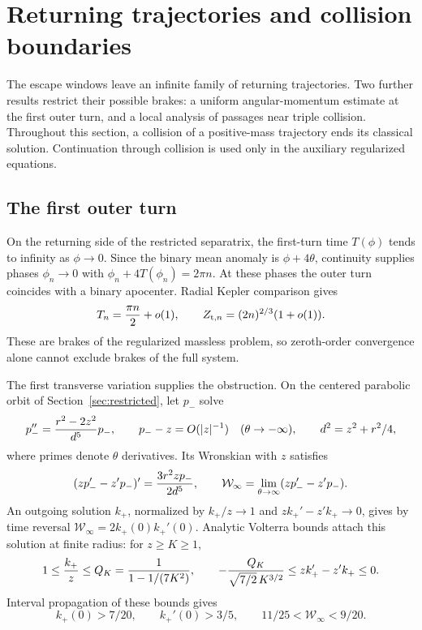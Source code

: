 \section{Returning trajectories and collision boundaries}\label{sec:returns}

The escape windows leave an infinite family of returning trajectories.
Two further results restrict their possible brakes: a uniform angular-momentum
estimate at the first outer turn, and a local analysis of passages near
triple collision. Throughout this section, a collision of a positive-mass
trajectory ends its classical solution. Continuation through collision is
used only in the auxiliary regularized equations.

\subsection{The first outer turn}

On the returning side of the restricted separatrix, the first-turn time
$T(\phi)$ tends to infinity as $\phi\to0$. Since the binary mean anomaly
is $\phi+4\theta$, continuity supplies phases $\phi_n\to0$ with
$\phi_n+4T(\phi_n)=2\pi n$. At these phases the outer turn coincides
with a binary apocenter. Radial Kepler comparison gives
\[
 T_n={\pi n\over2}+o(1),\qquad Z_{{\rm t},n}=(2n)^{2/3}(1+o(1)).
\]
These are brakes of the regularized massless problem, so zeroth-order
convergence alone cannot exclude brakes of the full system.

The first transverse variation supplies the obstruction. On the centered
parabolic orbit of Section~\ref{sec:restricted}, let $p_-$ solve
\[
 p_-''={r^2-2z^2\over d^5}p_-,\qquad
 p_--z=O(|z|^{-1})\quad(\theta\to-\infty),\qquad
 d^2=z^2+r^2/4,
\]
where primes denote $\theta$ derivatives. Its Wronskian with $z$ satisfies
\[
 (zp_-'-z'p_-)'={3r^2zp_-\over2d^5},\qquad
 \mathcal W_\infty=\lim_{\theta\to\infty}(zp_-'-z'p_-).
\]
An outgoing solution $k_+$, normalized by $k_+/z\to1$ and
$zk_+'-z'k_+\to0$, gives by time reversal
$\mathcal W_\infty=2k_+(0)k_+'(0)$. Analytic Volterra bounds attach
this solution at finite radius: for $z\ge K\ge1$,
\[
 1\le{k_+\over z}\le Q_K={1\over1-1/(7K^2)},\qquad
 -{Q_K\over\sqrt{7/2}\,K^{3/2}}\le zk_+'-z'k_+\le0.
\]
Interval propagation of these bounds gives
\[
 k_+(0)>7/20,\qquad k_+'(0)>3/5,
 \qquad 11/25<\mathcal W_\infty<9/20.
\]

